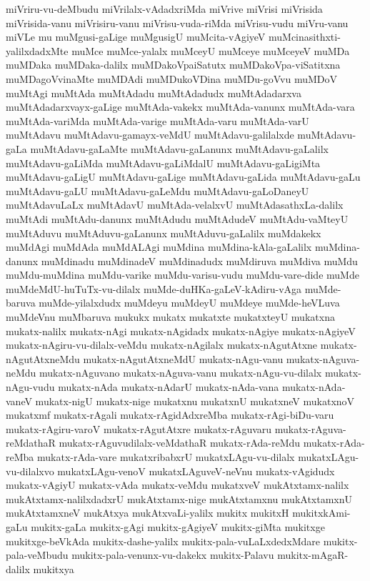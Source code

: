 {miVriru-vu-deMbudu
miVrilalx-vAdadxriMda
miVrive
miVrisi
miVrisida
miVrisida-vanu
miVrisiru-vanu
miVrisu-vuda-riMda
miVrisu-vudu
miVru-vanu
miVLe
mu
muMgusi-gaLige
muMgusigU
muMcita-vAgiyeV
muMcinasithxti-yalilxdadxMte
muMce
muMce-yalalx
muMceyU
muMceye
muMceyeV
muMDa
muMDaka
muMDaka-dalilx
muMDakoVpaiSatutx
muMDakoVpa-viSatitxna
muMDagoVvinaMte
muMDAdi
muMDukoVDina
muMDu-goVvu
muMDoV
muMtAgi
muMtAda
muMtAdadu
muMtAdadudx
muMtAdadarxva
muMtAdadarxvayx-gaLige
muMtAda-vakekx
muMtAda-vanunx
muMtAda-vara
muMtAda-variMda
muMtAda-varige
muMtAda-varu
muMtAda-varU
muMtAdavu
muMtAdavu-gamayx-veMdU
muMtAdavu-galilalxde
muMtAdavu-gaLa
muMtAdavu-gaLaMte
muMtAdavu-gaLanunx
muMtAdavu-gaLalilx
muMtAdavu-gaLiMda
muMtAdavu-gaLiMdalU
muMtAdavu-gaLigiMta
muMtAdavu-gaLigU
muMtAdavu-gaLige
muMtAdavu-gaLida
muMtAdavu-gaLu
muMtAdavu-gaLU
muMtAdavu-gaLeMdu
muMtAdavu-gaLoDaneyU
muMtAdavuLaLx
muMtAdavU
muMtAda-velalxvU
muMtAdasathxLa-dalilx
muMtAdi
muMtAdu-danunx
muMtAdudu
muMtAdudeV
muMtAdu-vaMteyU
muMtAduvu
muMtAduvu-gaLanunx
muMtAduvu-gaLalilx
muMdakekx
muMdAgi
muMdAda
muMdALAgi
muMdina
muMdina-kAla-gaLalilx
muMdina-danunx
muMdinadu
muMdinadeV
muMdinadudx
muMdiruva
muMdiva
muMdu
muMdu-muMdina
muMdu-varike
muMdu-varisu-vudu
muMdu-vare-dide
muMde
muMdeMdU-huTuTx-vu-dilalx
muMde-duHKa-gaLeV-kAdiru-vAga
muMde-baruva
muMde-yilalxdudx
muMdeyu
muMdeyU
muMdeye
muMde-heVLuva
muMdeVnu
muMbaruva
mukukx
mukatx
mukatxte
mukatxteyU
mukatxna
mukatx-nalilx
mukatx-nAgi
mukatx-nAgidadx
mukatx-nAgiye
mukatx-nAgiyeV
mukatx-nAgiru-vu-dilalx-veMdu
mukatx-nAgilalx
mukatx-nAgutAtxne
mukatx-nAgutAtxneMdu
mukatx-nAgutAtxneMdU
mukatx-nAgu-vanu
mukatx-nAguva-neMdu
mukatx-nAguvano
mukatx-nAguva-vanu
mukatx-nAgu-vu-dilalx
mukatx-nAgu-vudu
mukatx-nAda
mukatx-nAdarU
mukatx-nAda-vana
mukatx-nAda-vaneV
mukatx-nigU
mukatx-nige
mukatxnu
mukatxnU
mukatxneV
mukatxnoV
mukatxmf
mukatx-rAgali
mukatx-rAgidAdxreMba
mukatx-rAgi-biDu-varu
mukatx-rAgiru-varoV
mukatx-rAgutAtxre
mukatx-rAguvaru
mukatx-rAguva-reMdathaR
mukatx-rAguvudilalx-veMdathaR
mukatx-rAda-reMdu
mukatx-rAda-reMba
mukatx-rAda-vare
mukatxribabxrU
mukatxLAgu-vu-dilalx
mukatxLAgu-vu-dilalxvo
mukatxLAgu-venoV
mukatxLAguveV-neVnu
mukatx-vAgidudx
mukatx-vAgiyU
mukatx-vAda
mukatx-veMdu
mukatxveV
mukAtxtamx-nalilx
mukAtxtamx-nalilxdadxrU
mukAtxtamx-nige
mukAtxtamxnu
mukAtxtamxnU
mukAtxtamxneV
mukAtxya
mukAtxvaLi-yalilx
mukitx
mukitxH
mukitxkAmi-gaLu
mukitx-gaLa
mukitx-gAgi
mukitx-gAgiyeV
mukitx-giMta
mukitxge
mukitxge-beVkAda
mukitx-dashe-yalilx
mukitx-pala-vuLaLxdedxMdare
mukitx-pala-veMbudu
mukitx-pala-venunx-vu-dakekx
mukitx-Palavu
mukitx-mAgaR-dalilx
mukitxya
}

